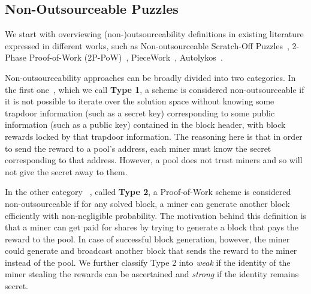 \documentclass[runningheads]{llncs}
\begin{document}


\subsection{Non-Outsourceable Puzzles}


We start with overviewing (non-)outsourceability definitions in existing literature expressed in different works, such as
Non-outsourceable Scratch-Off Puzzles~\cite{miller2015nonoutsourceable}, 2-Phase Proof-of-Work (2P-PoW)~\cite{twophase},
PieceWork~\cite{daian2017short}, Autolykos~\cite{autolykos}.


Non-outsourceability approaches can be broadly divided into two categories. In the first one~\cite{autolykos,daian2017short,twophase}, which we call \textbf{Type 1}, a scheme is considered
non-outsourceable if it is not possible to iterate over the solution space without knowing some trapdoor information (such as a secret key) corresponding to some public information (such as a public key) contained in the block header, with block rewards locked by that trapdoor information. The reasoning here is that in order to send the reward to a pool's address, each miner must know the secret corresponding to that address. However, a pool does not trust miners and so will not give the secret away to them. 

In the other category
~\cite{miller2015nonoutsourceable}, called \textbf{Type 2}, a Proof-of-Work scheme is considered non-outsourceable if for any solved block, a miner can generate another block efficiently with non-negligible probability. The motivation behind this definition is that a miner can get paid for shares
by trying to generate a block that pays the reward to the pool. In case of successful block generation, however, the miner could generate and broadcast another block that sends the reward to the miner instead of the pool. 
We further classify Type 2 into {\em weak} if the identity of the miner stealing the rewards can be ascertained and {\em strong} if the identity remains secret.
\end{document}
